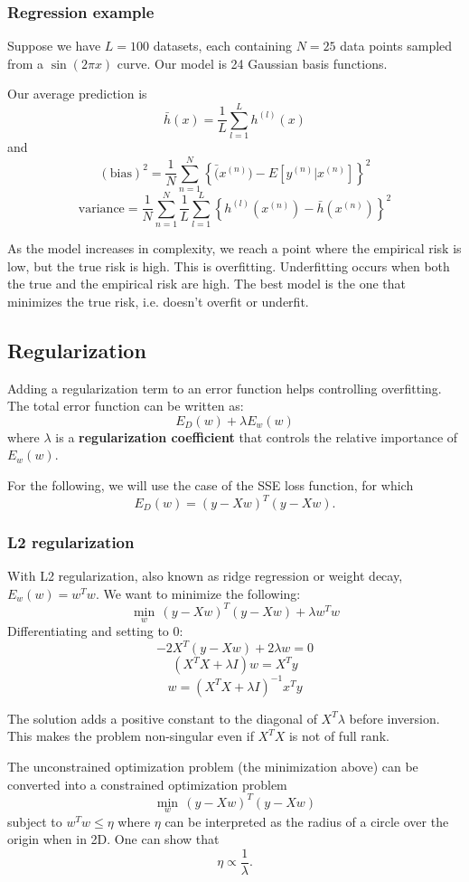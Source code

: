 \documentclass[a4paper,12pt]{article}
\begin{document}
\subsubsection{Regression example}

Suppose we have $L=100$ datasets, each containing $N=25$ data points sampled from a $\sin(2\pi x)$ curve. Our model is 24 Gaussian basis functions. 

Our average prediction is 
$$\bar h(x) = \frac{1}{L} \sum_{l=1}^L h^{(l)}(x)$$
and 
$$(\text{bias})^2 = \frac{1}{N} \sum_{n=1}^N \left\{\bar (x^{(n)}) - E[y^{(n)}|x^{(n)}] \right\}^2$$
$$\text{variance} = \frac{1}{N} \sum_{n=1}^N \frac{1}{L} \sum_{l=1}^L \left\{h^{(l)}(x^{(n)}) - \bar h(x^{(n)})\right\}^2$$

As the model increases in complexity, we reach a point where the empirical risk is low, but the true risk is high. This is overfitting. Underfitting occurs when both the true and the empirical risk are high. The best model is the one that minimizes the true risk, i.e. doesn't overfit or underfit. 


\subsection{Regularization}

Adding a regularization term to an error function helps controlling overfitting. The total error function can be written as: 
$$E_D(w) + \lambda E_w(w)$$
where $\lambda$ is a \textbf{regularization coefficient} that controls the relative importance of $E_w(w)$. 

For the following, we will use the case of the SSE loss function, for which
$$E_D(w) = (y-Xw)^T(y-Xw).$$

\subsubsection{L2 regularization}

With L2 regularization, also known as ridge regression or weight decay, $E_w(w) = w^Tw$. We want to minimize the following: 
$$\min_w \, (y-Xw)^T(y-Xw) + \lambda w^Tw$$
Differentiating and setting to 0: 
$$-2X^T(y-Xw)+2\lambda w = 0$$
$$(X^TX + \lambda I)w = X^Ty$$
$$w = (X^TX + \lambda I)^{-1} x^Ty$$

The solution adds a positive constant to the diagonal of $X^T\lambda$ before inversion. This makes the problem non-singular even if $X^TX$ is not of full rank. 

The unconstrained optimization problem (the minimization above) can be converted into a constrained optimization problem
$$\min_w \, (y-Xw)^T(y-Xw)$$
subject to $w^Tw \leq \eta$ where $\eta$ can be interpreted as the radius of a circle over the origin when in 2D. One can show that 
$$\eta \propto \frac{1}{\lambda}.$$
\end{document}
